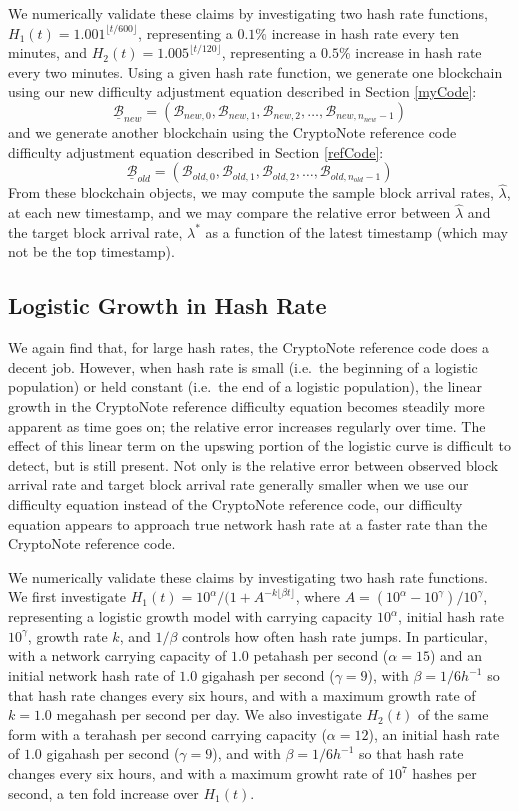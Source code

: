 \documentclass[12pt,english]{mrl}
\theoremstyle{definition}
\numberwithin{equation}{section}
\numberwithin{figure}{section}
\numberwithin{equation}{section}
\numberwithin{equation}{section}
\numberwithin{figure}{section}
\begin{document}
We numerically validate these claims by investigating two hash rate functions, $H_1(t) = 1.001^{\lfloor t/600 \rfloor}$, representing a $0.1\%$ increase in hash rate every ten minutes, and $H_2(t) = 1.005^{\lfloor t/120 \rfloor}$, representing a $0.5\%$ increase in hash rate every two minutes. Using a given hash rate function, we generate one blockchain using our new difficulty adjustment equation described in Section \ref{myCode}:
\[\underline{\mathcal{B}}_{new} = (\mathcal{B}_{new,0}, \mathcal{B}_{new,1}, \mathcal{B}_{new,2}, \ldots, \mathcal{B}_{new,n_{new}-1})\]
and we generate another blockchain using the CryptoNote reference code difficulty adjustment equation described in Section \ref{refCode}:
\[\underline{\mathcal{B}}_{old} = (\mathcal{B}_{old,0}, \mathcal{B}_{old,1}, \mathcal{B}_{old,2}, \ldots, \mathcal{B}_{old,n_{old}-1})\]
From these blockchain objects, we may compute the sample block arrival rates, $\hat{\lambda}$, at each new timestamp, and we may compare the relative error between $\hat{\lambda}$ and the target block arrival rate, $\lambda^{*}$ as a function of the latest timestamp (which may not be the top timestamp).

\subsection{Logistic Growth in Hash Rate}\label{logComp}

We again find that, for large hash rates, the CryptoNote reference code does a decent job. However, when hash rate is small (i.e.\ the beginning of a logistic population) or held constant (i.e.\ the end of a logistic population), the linear growth in the CryptoNote reference difficulty equation becomes steadily more apparent as time goes on; the relative error increases regularly over time. The effect of this linear term on the upswing portion of the logistic curve is difficult to detect, but is still present.  Not only is the relative error between observed block arrival rate and target block arrival rate generally smaller when we use our difficulty equation instead of the CryptoNote reference code, our difficulty equation appears to approach true network hash rate at a faster rate than the CryptoNote reference code.

We numerically validate these claims by investigating two hash rate functions. We first investigate $H_1(t) = 10^\alpha/(1+A^{-k \lfloor \beta t \rfloor}$, where $A = (10^{\alpha} - 10^{\gamma})/10^{\gamma}$, representing a logistic growth model with carrying capacity $10^\alpha$, initial hash rate $10^{\gamma}$, growth rate $k$, and $1/\beta$ controls how often hash rate jumps. In particular, with a network carrying capacity of $1.0$ petahash per second ($\alpha = 15$) and an initial network hash rate of $1.0$ gigahash per second ($\gamma = 9$), with $\beta = 1/6 h^{-1}$ so that hash rate changes every six hours, and with a maximum growth rate of $k=1.0$ megahash per second per day.   We also investigate $H_2(t)$ of the same form with a terahash per second carrying capacity ($\alpha =12$), an initial hash rate of $1.0$ gigahash per second ($\gamma = 9$), and with $\beta = 1/6 h^{-1}$ so that hash rate changes every six hours, and with a maximum growht rate of $10^7$ hashes per second, a ten fold increase over $H_1(t)$.
\end{document}
